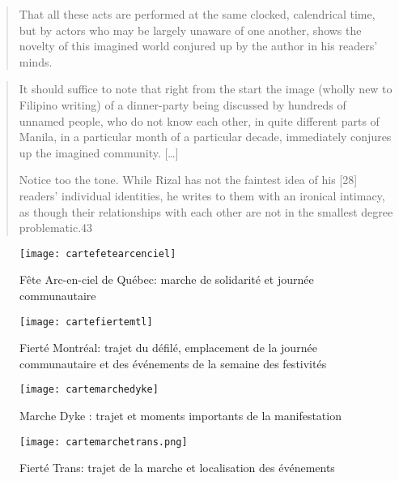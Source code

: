\begin{quote}
  That all these acts are performed at the same clocked, calendrical time, but by actors who may be largely unaware of one another, shows the novelty of this imagined world conjured up by the author in his readers’ minds.
  \citep[26]{Anderson1983}
\end{quote}

\begin{quote}

  It should suffice to note that right from the start the image (wholly new to Filipino writing) of a dinner-party being discussed by hundreds of unnamed people, who do not know each other, in quite different parts of Manila, in a particular month of a particular decade, immediately conjures up the imagined community.
  [\ldots]

  Notice too the tone.
  While Rizal has not the faintest idea of his [28] readers’ individual identities, he writes to them with an ironical intimacy, as though their relationships with each other are not in the smallest degree problematic.43
\end{quote}

\begin{figure}[ht]
  \centering
  \texttt{[image: cartefetearcenciel]}
  \caption[Fête Arc-en-ciel de Québec]{Fête Arc-en-ciel de Québec: marche de solidarité et journée communautaire}
  \label{fig:cartefetearcenciel}
\end{figure}

\begin{figure}[ht]
  \centering
  \texttt{[image: cartefiertemtl]}
  \caption[Fierté Montréal: trajet du défilé]{Fierté Montréal: trajet du défilé, emplacement de la journée communautaire et des événements de la semaine des festivités}
  \label{fig:cartefiertemtl}
\end{figure}

\begin{figure}[ht]
  \centering
  \texttt{[image: cartemarchedyke]}
  \caption[Marche Dyke: trajet et événements]{Marche Dyke : trajet et moments importants de la manifestation}
  \label{fig:cartemarchedyke}
\end{figure}

\begin{figure}[ht]
  \centering
  \texttt{[image: cartemarchetrans.png]}
  \caption[Fierté trans: trajet et événements]{Fierté Trans: trajet de la marche et localisation des événements}
  \label{fig:cartemarchetrans}
\end{figure}


